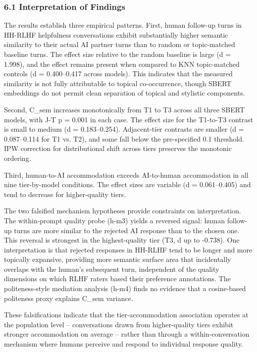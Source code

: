 
\subsubsection{6.1 Interpretation of Findings}

The results establish three empirical patterns. First, human follow-up turns in HH-RLHF helpfulness conversations exhibit substantially higher semantic similarity to their actual AI partner turns than to random or topic-matched baseline turns. The effect size relative to the random baseline is large (d = 1.998), and the effect remains present when compared to KNN topic-matched controls (d = 0.400--0.417 across models). This indicates that the measured similarity is not fully attributable to topical co-occurrence, though SBERT embeddings do not permit clean separation of topical and stylistic components.

Second, C\_sem increases monotonically from T1 to T3 across all three SBERT models, with J-T p = 0.001 in each case. The effect size for the T1-to-T3 contrast is small to medium (d = 0.183--0.254). Adjacent-tier contrasts are smaller (d = 0.087--0.114 for T1 vs. T2), and some fall below the pre-specified 0.1 threshold. IPW correction for distributional shift across tiers preserves the monotonic ordering.

Third, human-to-AI accommodation exceeds AI-to-human accommodation in all nine tier-by-model conditions. The effect sizes are variable (d = 0.061--0.405) and tend to decrease for higher-quality tiers.

The two falsified mechanism hypotheses provide constraints on interpretation. The within-prompt quality probe (h-m3) yields a reversed signal: human follow-up turns are more similar to the rejected AI response than to the chosen one. This reversal is strongest in the highest-quality tier (T3, d up to -0.738). One interpretation is that rejected responses in HH-RLHF tend to be longer and more topically expansive, providing more semantic surface area that incidentally overlaps with the human's subsequent turn, independent of the quality dimensions on which RLHF raters based their preference annotations. The politeness-style mediation analysis (h-m4) finds no evidence that a cosine-based politeness proxy explains C\_sem variance.

These falsifications indicate that the tier-accommodation association operates at the population level -- conversations drawn from higher-quality tiers exhibit stronger accommodation on average -- rather than through a within-conversation mechanism where humans perceive and respond to individual response quality.

